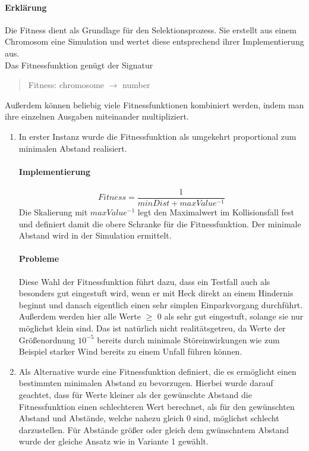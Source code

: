 \documentclass[12pt,a4paper]{scrartcl}
\begin{document}
\paragraph {Erklärung}
Die Fitness dient als Grundlage für den Selektionsprozess. Sie erstellt aus einem Chromosom eine Simulation und wertet diese entsprechend ihrer Implementierung aus.\\
Das Fitnessfunktion genügt der Signatur
\begin{quote}
	\textsf{Fitness: chromosome $\rightarrow$ number}
\end{quote}
Außerdem können beliebig viele Fitnessfunktionen kombiniert werden, indem man ihre einzelnen Ausgaben miteinander multipliziert.
\begin{enumerate}
	\item In erster Instanz wurde die Fitnessfunktion als umgekehrt proportional zum minimalen Abstand realisiert.
	\paragraph{Implementierung}
	\[Fitness = \frac{1}{minDist + maxValue^{-1}}\]
Die Skalierung mit $maxValue^{-1}$ legt den Maximalwert im Kollisionsfall fest und definiert damit die obere Schranke für die Fitnessfunktion. Der minimale Abstand wird in der Simulation ermittelt.
\paragraph{Probleme} Diese Wahl der Fitnessfunktion führt dazu, dass ein Testfall auch als besonders gut eingestuft wird, wenn er mit Heck direkt an einem Hindernis beginnt und danach eigentlich einen sehr simplen Einparkvorgang durchführt.\\
Außerdem werden hier alle Werte $\ge$ 0 als sehr gut eingestuft, solange sie nur möglichst klein sind. Das ist natürlich nicht realitätsgetreu, da Werte der Größenordnung $10^{-5}$ bereits durch minimale Störeinwirkungen wie zum Beispiel starker Wind bereits zu einem Unfall führen können.
	\item Als Alternative wurde eine Fitnessfunktion definiert, die es ermöglicht einen bestimmten minimalen Abstand zu bevorzugen. Hierbei wurde darauf geachtet, dass für Werte kleiner als der gewünschte Abstand die Fitnessfunktion einen \glqq schlechteren\grqq $ $ Wert berechnet, als für den gewünschten Abstand und Abstände, welche nahezu gleich 0 sind, möglichst schlecht darzustellen. Für Abstände größer oder gleich dem gwünschntem Abstand wurde der gleiche Ansatz wie in Variante 1 gewählt.\\

\end{enumerate}
\end{document}
